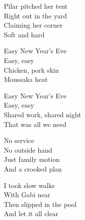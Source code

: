 \begin{lyrics}
Pilar pitched her tent\\
Right out in the yard\\
Claiming her corner\\
Soft and hard

Easy New Year's Eve\\
Easy, easy\\
Chicken, pork skin\\
Moussaka heat

Easy New Year's Eve\\
Easy, easy\\
Shared work, shared night\\
That was all we need

No service\\
No outside hand\\
Just family motion\\
And a crooked plan

I took slow walks\\
With Gabi near\\
Then slipped in the pool\\
And let it all clear
\end{lyrics}

